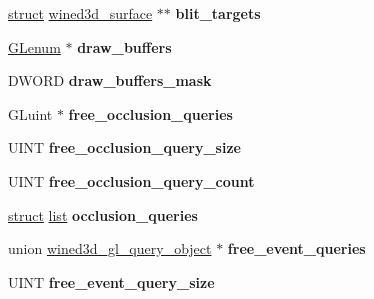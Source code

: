 \begin{DoxyCompactItemize}
\item 
\mbox{\label{structwined3d__context_a986629102ebdb61997efff667d6b252b}} 
\hyperlink{interfacestruct}{struct} \hyperlink{structwined3d__surface}{wined3d\+\_\+surface} $\ast$$\ast$ {\bfseries blit\+\_\+targets}
\item 
\mbox{\label{structwined3d__context_a834aa1ec70f46f422dc42ef7c4511172}} 
\hyperlink{interfacevoid}{G\+Lenum} $\ast$ {\bfseries draw\+\_\+buffers}
\item 
\mbox{\label{structwined3d__context_a4492dc79229cbb7959fb3dd2080e39fa}} 
D\+W\+O\+RD {\bfseries draw\+\_\+buffers\+\_\+mask}
\item 
\mbox{\label{structwined3d__context_a9da606be3511d32a17fe9c35beaedc12}} 
G\+Luint $\ast$ {\bfseries free\+\_\+occlusion\+\_\+queries}
\item 
\mbox{\label{structwined3d__context_ad611d16e2229777d8c7fc8a0f2021255}} 
U\+I\+NT {\bfseries free\+\_\+occlusion\+\_\+query\+\_\+size}
\item 
\mbox{\label{structwined3d__context_afa37292905410703b4391c76b76b5ad8}} 
U\+I\+NT {\bfseries free\+\_\+occlusion\+\_\+query\+\_\+count}
\item 
\mbox{\label{structwined3d__context_aa05259a39b7e6f402048950bb78d8b46}} 
\hyperlink{interfacestruct}{struct} \hyperlink{classlist}{list} {\bfseries occlusion\+\_\+queries}
\item 
\mbox{\label{structwined3d__context_a9e8c0082e148a0d8c1b3050e3f1f4359}} 
union \hyperlink{unionwined3d__gl__query__object}{wined3d\+\_\+gl\+\_\+query\+\_\+object} $\ast$ {\bfseries free\+\_\+event\+\_\+queries}
\item 
\mbox{\label{structwined3d__context_a92b834fcc04382caa52ca82cf63db45b}} 
U\+I\+NT {\bfseries free\+\_\+event\+\_\+query\+\_\+size}
\item 
\mbox{\label{structwined3d__context_a35e347963a40b71f78a5cdf0d494b355}} 
$$
\end{DoxyCompactItemize}
